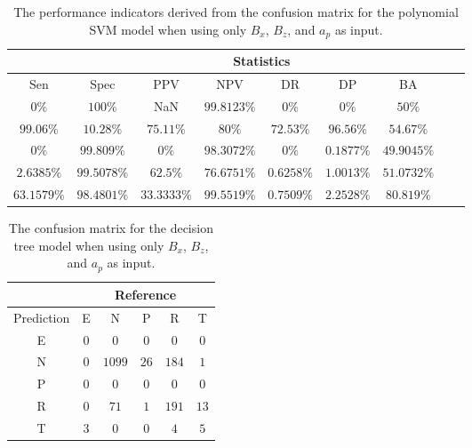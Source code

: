 \begin{table}[!ht]
	\centering
	\begin{tabular}{|c|c|c|c|c|c|c|c|c|}
		\hline
		 & \multicolumn{7}{c|}{Statistics} \\ \hline
		Sen & Spec & PPV & NPV & DR & DP & BA \\ \hline
		$0\%$ & $100\%$ & NaN & $99.8123\%$ & $0\%$ & $0\%$ & $50\%$ \\ \hline
		$99.06\%$ & $10.28\%$ & $75.11\%$ & $80\%$ & $72.53\%$ & $96.56\%$ & $54.67\%$ \\ \hline
		$0\%$ & $99.809\%$ & $0\%$ & $98.3072\%$ & $0\%$ & $0.1877\%$ & $49.9045\%$ \\ \hline
		$2.6385\%$ & $99.5078\%$ & $62.5\%$ & $76.6751\%$ & $0.6258\%$ & $1.0013\%$ & $51.0732\%$ \\ \hline
		$63.1579\%$ & $98.4801\%$ & $33.3333\%$ & $99.5519\%$ & $0.7509\%$ & $2.2528\%$ & $80.819\%$ \\ \hline
	\end{tabular}
	\caption{The performance indicators derived from the confusion matrix for the polynomial SVM model when using only $B_{x}$, $B_{z}$, and $a_{p}$ as input.}
	\label{tab:cs:xzap:svmPoly}
\end{table}

\begin{table}[!ht]
	\centering
	\begin{tabular}{|c|c|c|c|c|c|}
		\hline
		 & \multicolumn{5}{|c|}{Reference} \\ \hline
		 Prediction & E & N & P & R & T \\ \hline
		 E & $0$ & $0$ & $0$ & $0$ & $0$ \\ \hline
		 N & $0$ & $1099$ & $26$ & $184$ & $1$ \\ \hline
		 P & $0$ & $0$ & $0$ & $0$ & $0$ \\ \hline
		 R & $0$ & $71$ & $1$ & $191$ & $13$ \\ \hline
		 T & $3$ & $0$ & $0$ & $4$ & $5$ \\ \hline
	\end{tabular}
	\caption{The confusion matrix for the decision tree model when using only $B_{x}$, $B_{z}$, and $a_{p}$ as input.}
	\label{tab:cm:xzap:C5.0}
\end{table}

